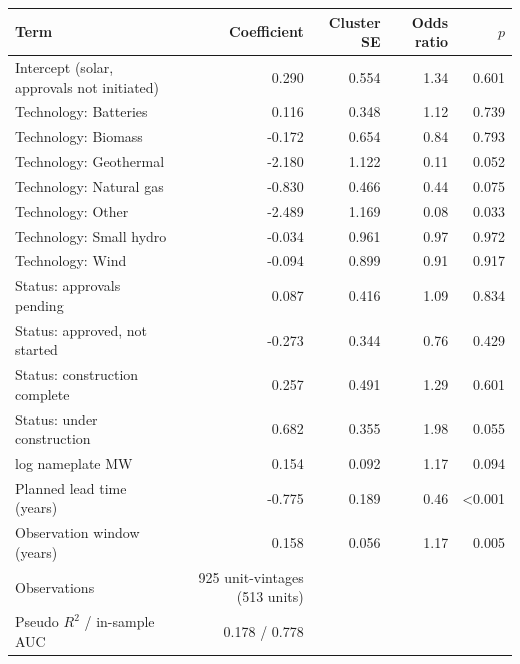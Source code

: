\begin{tabular}{lrrrr}
\toprule
Term & Coefficient & Cluster SE & Odds ratio & $p$ \\
\midrule
Intercept (solar, approvals not initiated) & 0.290 & 0.554 & 1.34 & 0.601 \\
Technology: Batteries & 0.116 & 0.348 & 1.12 & 0.739 \\
Technology: Biomass & -0.172 & 0.654 & 0.84 & 0.793 \\
Technology: Geothermal & -2.180 & 1.122 & 0.11 & 0.052 \\
Technology: Natural gas & -0.830 & 0.466 & 0.44 & 0.075 \\
Technology: Other & -2.489 & 1.169 & 0.08 & 0.033 \\
Technology: Small hydro & -0.034 & 0.961 & 0.97 & 0.972 \\
Technology: Wind & -0.094 & 0.899 & 0.91 & 0.917 \\
Status: approvals pending & 0.087 & 0.416 & 1.09 & 0.834 \\
Status: approved, not started & -0.273 & 0.344 & 0.76 & 0.429 \\
Status: construction complete & 0.257 & 0.491 & 1.29 & 0.601 \\
Status: under construction & 0.682 & 0.355 & 1.98 & 0.055 \\
log nameplate MW & 0.154 & 0.092 & 1.17 & 0.094 \\
Planned lead time (years) & -0.775 & 0.189 & 0.46 & <0.001 \\
Observation window (years) & 0.158 & 0.056 & 1.17 & 0.005 \\
\midrule
Observations & 925 unit-vintages (513 units) & & & \\
Pseudo $R^2$ / in-sample AUC & 0.178 / 0.778 & & & \\
\bottomrule
\end{tabular}